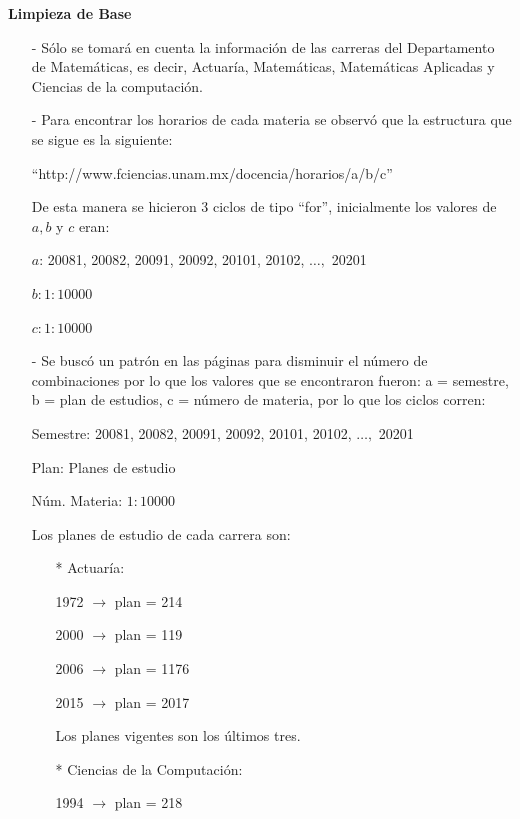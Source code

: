 \documentclass[12pt,spanish]{report}
\begin{document}
\begin{center}
\textbf{Limpieza de Base}
\end{center}

\begin{itemize}

\item[-] Sólo se tomará en cuenta la información de las carreras del Departamento de Matemáticas, es decir, Actuaría, Matemáticas, Matemáticas Aplicadas y Ciencias de la computación.

\item[-] Para encontrar los horarios de cada materia se observó que la estructura que se sigue es la siguiente:

\begin{center}
``http://www.fciencias.unam.mx/docencia/horarios/a/b/c''
\end{center}

De esta manera se hicieron 3 ciclos de tipo ``for'', inicialmente los valores de $a, b $ y $c$ eran:

$a$: 20081, 20082, 20091, 20092, 20101, 20102, $\ldots,$ 20201

$b: 1:10000$

$c: 1:10000$

\item[-] Se buscó un patrón en las páginas para disminuir el número de combinaciones por lo que los valores que se encontraron fueron: a = semestre, b = plan de estudios, c = número de materia, por lo que los ciclos corren:

Semestre: 20081, 20082, 20091, 20092, 20101, 20102, $\ldots,$ 20201

Plan: Planes de estudio

Núm. Materia: $1:10000$

Los planes de estudio de cada carrera son:

\begin{itemize}
\item[*] Actuaría:

1972 $\rightarrow$ plan = 214

2000 $\rightarrow$ plan = 119

2006 $\rightarrow$ plan = 1176

2015 $\rightarrow$ plan = 2017

Los planes vigentes son los últimos tres.

\item[*] Ciencias de la Computación:

1994 $\rightarrow$ plan = 218


\end{itemize}
\end{itemize}
\end{document}
